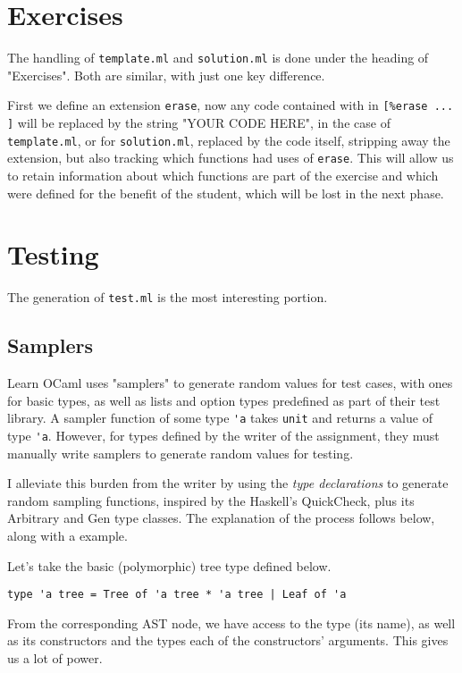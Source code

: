 \documentclass[11pt]{article} %
\begin{document}
\section{Exercises}
The handling of \verb+template.ml+ and \verb+solution.ml+ is done under the heading of "Exercises". Both are similar, with just one key difference.

First we define an extension \verb+erase+, now any code contained with in \verb+[%erase ... ]+ will be replaced by the string "YOUR CODE HERE", in the case of \verb+template.ml+, or for \verb+solution.ml+, replaced by the code itself, stripping away the extension, but also tracking which functions had uses of \verb+erase+. This will allow us to retain information about which functions are part of the exercise and which were defined for the benefit of the student, which will be lost in the next phase.

\section{Testing}

The generation of \verb+test.ml+ is the most interesting portion.

\subsection{Samplers}
Learn OCaml uses "samplers" to generate random values for test cases, with ones for basic types, as well as lists and option types predefined as part of their test library. A sampler function of some type \verb+'a+ takes \verb+unit+ and returns a value of type \verb+'a+. However, for types defined by the writer of the assignment, they must manually write samplers to generate random values for testing.

I alleviate this burden from the writer by using the \textit{type declarations} to generate random sampling functions, inspired by the Haskell's QuickCheck, plus its Arbitrary and Gen type classes. The explanation of the process follows below, along with a example.

Let's take the basic (polymorphic) tree type defined below.

\begin{lstlisting}
type 'a tree = Tree of 'a tree * 'a tree | Leaf of 'a
\end{lstlisting}

From the corresponding AST node, we have access to the type (its name), as well as its constructors and the types each of the constructors' arguments. This gives us a lot of power.
\end{document}
